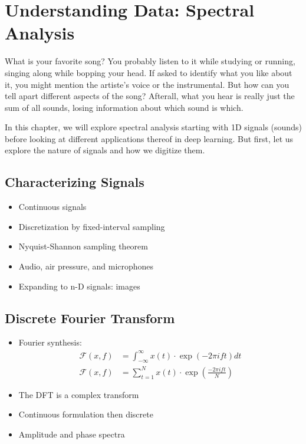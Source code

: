 \documentclass[paper=a4, fontsize=12pt]{scrartcl} %
\numberwithin{equation}{section} %
\numberwithin{figure}{section} %
\numberwithin{table}{section} %
\begin{document}
\section{Understanding Data: Spectral Analysis}

What is your favorite song? You probably listen to it while studying or running, singing along
while bopping your head. If asked to identify what you like about it, you might mention the artiste's voice 
or the instrumental. But how can you tell apart different aspects of the song? Afterall, what you hear 
is really just the sum of all sounds, losing information about which sound is which.

In this chapter, we will explore spectral analysis starting with 1D signals (sounds) before looking at different 
applications thereof in deep learning. But first, let us explore the nature of signals and how we digitize them.

\subsection{Characterizing Signals}

\begin{itemize}
    \item Continuous signals
    \item Discretization by fixed-interval sampling
    \item Nyquist-Shannon sampling theorem
    \item Audio, air pressure, and microphones
    \item Expanding to n-D signals: images
\end{itemize}

\subsection{Discrete Fourier Transform}

\begin{itemize}
    \item Fourier synthesis:
    \begin{align*}
        \mathcal{F}(x, f) &= \int_{-\infty}^{\infty} x(t) \cdot \exp \left( -2 \pi i f t \right) dt \\
        \mathcal{F}(x, f) &= \sum_{t=1}^{N} x(t) \cdot \exp \left( \frac{-2 \pi i f t }{N} \right)
    \end{align*}
    \item The DFT is a complex transform
    \item Continuous formulation then discrete
    \item Amplitude and phase spectra
\end{itemize}
\end{document}
